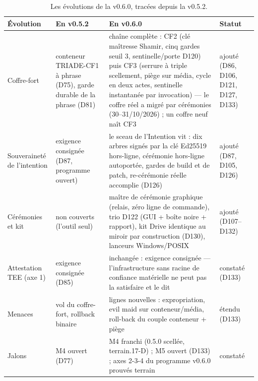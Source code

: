 \begin{table}[htbp]
\centering\small
\caption{Les évolutions de la v0.6.0, tracées depuis la v0.5.2.}
\label{tab:correspondance060}
\begin{tabularx}{\textwidth}{@{}l Y Y l@{}}
\toprule
\textbf{Évolution} & \textbf{En v0.5.2} & \textbf{En v0.6.0} & \textbf{Statut} \\
\midrule
Coffre-fort & conteneur TRIADE-CF1 à phrase (D75), garde durable de la phrase (D81) &
chaîne complète : CF2 (clé maîtresse Shamir, cinq gardes seuil 3, sentinelle/porte
D120) puis CF3 (serrure à triple scellement, piège sur média, cycle en deux actes,
sentinelle instantanée par invocation) — le coffre réel a migré par cérémonies
(30--31/10/2026) ; un coffre neuf naît CF3 & ajouté (D86, D106, D121, D127, D133) \\
Souveraineté de l'intention & exigence consignée (D87, programme ouvert) & le sceau de
l'Intention vit : dix arbres signés par la clé Ed25519 hors-ligne, cérémonie hors-ligne
autoportée, gardes de build et de patch, re-cérémonie réelle accomplie (D126) &
ajouté (D87, D105, D126) \\
Cérémonies et kit & non couverts (l'outil  seul) & maître de
cérémonie graphique (relais, zéro ligne de commande), trio D122 (GUI + boîte noire +
rapport), kit Drive identique au miroir par construction (D130), lanceurs Windows/POSIX &
ajouté (D107--D132) \\
Attestation TEE (axe 1) & exigence consignée (D85) & inchangée : exigence consignée —
l'infrastructure sans racine de confiance matérielle ne peut pas la satisfaire et le dit &
constaté (D133) \\
Menaces & vol du coffre-fort, rollback binaire & lignes nouvelles : expropriation, evil
maid sur conteneur/média, roll-back du couple conteneur + piège & étendu (D133) \\
Jalons & M4 ouvert (D77) & M4 franchi (0.5.0 scellée, terrain.17-D) ; M5 ouvert (D133) ;
axes 2-3-4 du programme v0.6.0 prouvés terrain & constaté \\
\bottomrule
\end{tabularx}
\end{table}

